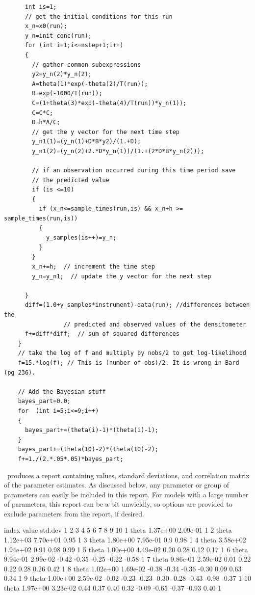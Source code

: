 \documentclass{admbmanual}
\begin{document}
\begin{lstlisting}
      int is=1;
      // get the initial conditions for this run
      x_n=x0(run);
      y_n=init_conc(run);
      for (int i=1;i<=nstep+1;i++)
      {
        // gather common subexpressions
        y2=y_n(2)*y_n(2);
        A=theta(1)*exp(-theta(2)/T(run));
        B=exp(-1000/T(run));
        C=(1+theta(3)*exp(-theta(4)/T(run))*y_n(1));
        C=C*C;
        D=h*A/C;
        // get the y vector for the next time step
        y_n1(1)=(y_n(1)+D*B*y2)/(1.+D);
        y_n1(2)=(y_n(2)+2.*D*y_n(1))/(1.+(2*D*B*y_n(2)));

        // if an observation occurred during this time period save
        // the predicted value
        if (is <=10)
        {
          if (x_n<=sample_times(run,is) && x_n+h >= sample_times(run,is))
          {
            y_samples(is++)=y_n;
          }
        }
        x_n+=h;  // increment the time step
        y_n=y_n1;  // update the y vector for the next step

      }
      diff=(1.0+y_samples*instrument)-data(run); //differences between the
                 // predicted and observed values of the densitometer
      f+=diff*diff;  // sum of squared differences
    }
    // take the log of f and multiply by nobs/2 to get log-likelihood
    f=15.*log(f); // This is (number of obs)/2. It is wrong in Bard (pg 236).

    // Add the Bayesian stuff
    bayes_part=0.0;
    for  (int i=5;i<=9;i++)
    {
      bayes_part+=(theta(i)-1)*(theta(i)-1);
    }
    bayes_part+=(theta(10)-2)*(theta(10)-2);
    f+=1./(2.*.05*.05)*bayes_part;

\end{lstlisting}

\ADM\ produces a report containing values, standard deviations, and correlation
matrix of the parameter estimates. As discussed below, any parameter or group of
parameters can easily be included in this report. For models with a large number
of parameters, this report can be a bit unwieldly, so options are provided to
exclude parameters from the report, if desired.

\begin{smallcode}[commentchar=\%]
 index          value   std.dev     1     2     3     4     5     6     7%
     8     9     10
    1   theta  1.37e+00 2.09e-01     1
    2   theta  1.12e+03 7.70e+01  0.95     1
    3   theta  1.80e+00 7.95e-01   0.9  0.98     1
    4   theta  3.58e+02 1.94e+02  0.91  0.98  0.99     1
    5   theta  1.00e+00 4.49e-02  0.20  0.28  0.12  0.17     1
    6   theta  9.94e-01 2.99e-02 -0.42 -0.35 -0.25 -0.22 -0.58     1
    7   theta  9.86e-01 2.59e-02  0.01  0.22  0.22  0.28  0.26  0.42     1
    8   theta  1.02e+00 1.69e-02 -0.38 -0.34 -0.36 -0.30  0.09  0.63  0.34%
     1
    9   theta  1.00e+00 2.59e-02 -0.02 -0.23 -0.23 -0.30 -0.28 -0.43 -0.98%
 -0.37     1
   10   theta  1.97e+00 3.23e-02  0.44  0.37  0.40  0.32 -0.09 -0.65 -0.37%
  -0.93  0.40    1
\end{smallcode}
\end{document}
